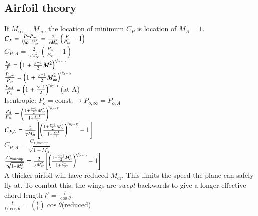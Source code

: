 \subsection*{Airfoil theory}
If $M_\infty=M_\text{cr}$, the location of minimum $C_P$ is location of $M_A=1$.\\
$C_P=\frac{P-P_\infty}{\sfrac{1}{2}\rho_\infty V_\infty^2}=\frac{2}{\gamma M_\infty^2}\left(\frac{P}{P_\infty}-1\right)$\\
$C_{P,A}=\frac{2}{\gamma M_\infty^2}\left(\frac{P_A}{P_\infty}-1\right)$\\
$\frac{P_o}{P}=\left(1+\frac{\gamma-1}{2}M^2\right)^{\sfrac{\gamma}{(\gamma-1)}}$\\
$\frac{P_{o,\infty}}{P_\infty}=\left(1+\frac{\gamma-1}{2}M_\infty^2\right)^{\sfrac{\gamma}{(\gamma-1)}}$\\
$\frac{P_{o,A}}{P_A}=\left(1+\frac{\gamma-1}{2}\right)^{\sfrac{\gamma}{(\gamma-1)}}$\hfill(at A)\\
Isentropic: $P_o=\text{const.}\to P_{o,\infty}=P_{o,A}$\\
$\frac{P_A}{P_\infty}=\left(\frac{1+\frac{\gamma-1}{2}M_\text{cr}^2}{1+\frac{\gamma-1}{2}}\right)^{\sfrac{\gamma}{(\gamma-1)}}$\\
$C_{P,A}=\frac{2}{\gamma M_\text{cr}^2}\left[\left(\frac{1+\frac{\gamma-1}{2}M_\text{cr}^2}{1+\frac{\gamma-1}{2}}\right)^{\sfrac{\gamma}{(\gamma-1)}}-1\right]$\\
$C_{P,A}=\frac{C_{P,\text{incomp}}}{\sqrt{1-M_\text{cr}^2}}$\\
$\frac{C_{P,\text{incomp}}}{\sqrt{1-M_\text{cr}^2}}=\frac{2}{\gamma M_\text{cr}^2}\left[\left(\frac{1+\frac{\gamma-1}{2}M_\text{cr}^2}{1+\frac{\gamma-1}{2}}\right)^{\sfrac{\gamma}{(\gamma-1)}}-1\right]$\\
A thicker airfoil will have reduced $M_\text{cr}$. This limits the speed the plane can safely fly at. To combat this, the wings are \textit{swept} backwards to give a longer effective chord length $l'=\frac{l}{\cos\theta}$.\\
$\frac{t}{l/\cos\theta}=\left(\frac{t}{l}\right)\cos\theta$\hfill(reduced)\\
